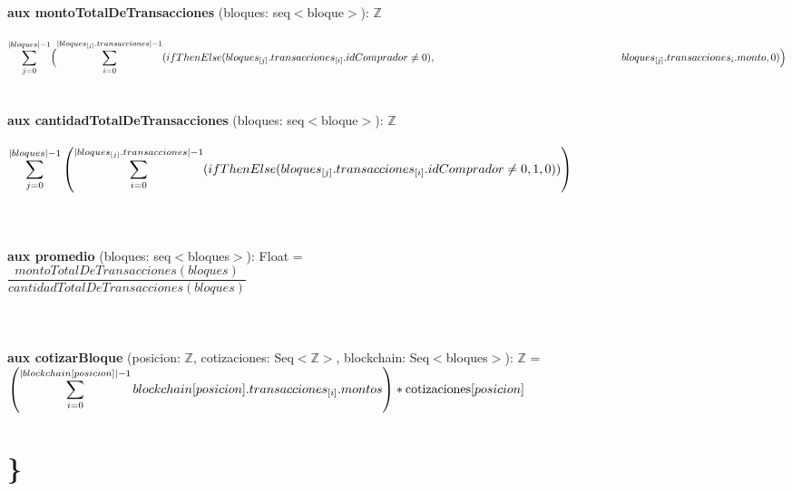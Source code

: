 \documentclass{article}
\newcommand{\Entero}{$\mathds{Z}$}
\begin{document}
        {\selectfont\textbf{aux montoTotalDeTransacciones} (bloques: seq$<$bloque$>$): \Entero}\\\\
    \indent\indent $\mathlarger\sum\limits_{j=0}^{|bloques|-1} \Bigl(\mathlarger\sum\limits_{i=0}^{|bloques_{[j]}.transacciones|-1}
        (ifThenElse (bloques_{[j]}.transacciones_{[i]}.idComprador \ne 0),\\
        \indent\indent\indent\indent\indent\indent\indent\indent\indent\indent\indent\indent bloques_{[j]}.transacciones_{{i}}.monto, 0)\Bigr)$\\\\\\

        {\selectfont\textbf{aux cantidadTotalDeTransacciones} (bloques: seq$<$bloque$>$): \Entero}\\\\
    \indent\indent$\mathlarger\sum\limits_{j=0}^{|bloques|-1} \left(\mathlarger\sum\limits_{i=0}^{|bloques_{[j]}.transacciones|-1} (ifThenElse(bloques_{[j]}.transacciones_{[i]}.idComprador \ne 0, 1, 0))\right)\indent\indent\indent$\\\\\\\\

    {\selectfont\textbf{aux promedio} (bloques: seq$<$bloques$>$): Float} = \\

    \indent\indent$\dfrac{montoTotalDeTransacciones(bloques)}{cantidadTotalDeTransacciones(bloques)}$\\\\\\\\

    {\selectfont\textbf{aux cotizarBloque} (posicion: \Entero, cotizaciones: Seq$<$\Entero$>$, blockchain: Seq$<$bloques$>$): \Entero} =\\

        \indent\indent $\left( \mathlarger{\sum\limits_{i=0}^{|blockchain[posicion]|-1} blockchain[posicion].transacciones_{[i]}.montos} \right) * \text{cotizaciones}[posicion]$\\

\section*{\}}
\end{document}
